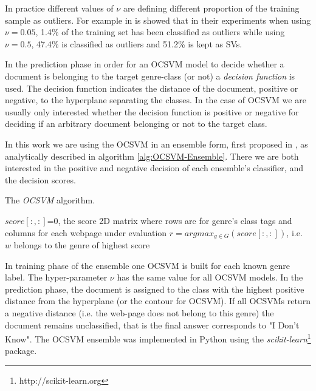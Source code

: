 In practice different values of $\nu$ are defining different proportion of the training sample as outliers. For example in  is showed that in their experiments when using $\nu=0.05$, 1.4\% of the training set has been classified as outliers while using $\nu=0.5$, 47.4\% is classified as outliers and 51.2\% is kept as SVs.

In the prediction phase in order for an OCSVM model to decide whether a document is belonging to the target genre-class (or not) a \textit{decision function} is used. The decision function indicates the distance of the document, positive or negative, to the hyperplane separating the classes. In the case of OCSVM we are usually only interested whether the decision function is positive or negative for deciding if an arbitrary document belonging or not to the target class.

In this work we are using the OCSVM in an ensemble form, first proposed in , as analytically described in algorithm \ref{alg:OCSVM-Ensemble}. There we are both interested in the positive and negative decision of each ensemble's classifier, and the decision scores.

\hfill \break

\begin{algorithm}[H]
\caption{The \textit{OCSVM} algorithm.}\label{alg:OCSVM-Ensemble}
$score[:, :]$=0, the score 2D matrix where rows are for genre's class tags and columns for each webpage under evaluation
{
        $r = argmax_{g \in G}(score[:, :])$, i.e. $w$ belongs to the genre of highest score\;
    }
\end{algorithm}

\hfill \break


In training phase of the ensemble one OCSVM is built for each known genre label. The hyper-parameter $\nu$ has the same value for all OCSVM models. In the prediction phase, the document is assigned to the class with the highest positive distance from the hyperplane (or the contour for OCSVM). If all OCSVMs return a negative distance (i.e. the web-page does not belong to this genre) the document remains unclassified, that is the final answer corresponds to "I Don't Know". The OCSVM ensemble was implemented in Python using the \textit{scikit-learn}\footnote{http://scikit-learn.org} package.


